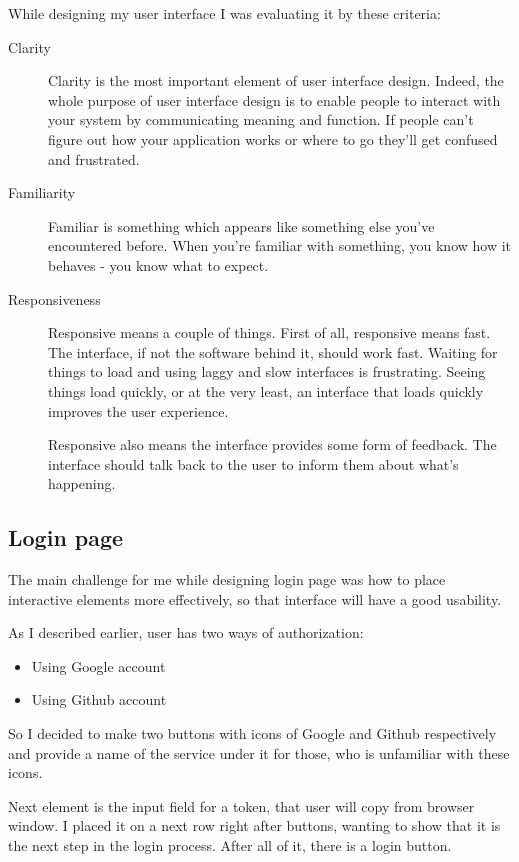 \documentclass[thesis=B,english]{FITthesis}[2012/10/20]
\begin{document}
While designing my user interface I was evaluating it by these criteria:
	\begin{description}
		\item [Clarity] Clarity is the most important element of user interface design. Indeed, the whole purpose of user interface design is to enable people to interact with your system by communicating meaning and function. If people can’t figure out how your application works or where to go they’ll get confused and frustrated. \cite{ui}
		\item [Familiarity] Familiar is something which appears like something else you’ve encountered before. When you’re familiar with something, you know how it behaves - you know what to expect.
		\item [Responsiveness] Responsive means a couple of things. First of all, responsive means fast. The interface, if not the software behind it, should work fast. Waiting for things to load and using laggy and slow interfaces is frustrating. Seeing things load quickly, or at the very least, an interface that loads quickly improves the user experience.

Responsive also means the interface provides some form of feedback. The interface should talk back to the user to inform them about what’s happening. \cite{ui}
	\end{description}
\subsection{Login page}
The main challenge for me while designing login page was how to place interactive elements more effectively, so that interface will have a good usability.

As I described earlier, user has two ways of authorization: 
	\begin{itemize}
		\item Using Google account
		\item Using Github account
	\end{itemize}
So I decided to make two buttons with icons of Google and Github respectively and provide a name of the service under it for those, who is unfamiliar with these icons.

Next element is the input field for a token, that user will copy from browser window. I placed it on a next row right after buttons, wanting to show that it is the next step in the login process. After all of it, there is a login button.
\end{document}
